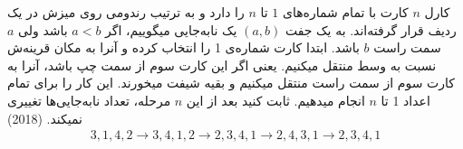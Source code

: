 کارل $n$ کارت با تمام شماره‌های $1$ تا $n$ را دارد و به ترتیب رندومی روی میزش در یک ردیف قرار گرفته‌اند.
به یک جفت $(a, b)$ یک نابه‌جایی میگوییم، اگر $a < b$ باشد ولی $a$ سمت راست $b$ باشد.
ابتدا کارت شماره‌ی 1 را انتخاب کرده و آنرا به مکان قرینه‌ش نسبت به وسط منتقل میکنیم.
یعنی اگر این کارت سوم از سمت چپ باشد، آنرا به کارت سوم از سمت راست منتقل میکنیم و بقیه شیفت میخورند.
این کار را برای تمام اعداد 1 تا $n$ انجام میدهیم.
ثابت کنید بعد از این $n$ مرحله، تعداد نابه‌جایی‌ها تغییری نمیکند.
(2018)
\begin{gather*}
    3,1,4,2\to 3,4,1,2\to 2,3,4,1\to 2,4,3,1\to 2,3,4,1
\end{gather*}